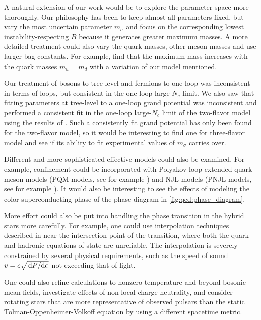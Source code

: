 A natural extension of our work would be to
explore the parameter space more thoroughly.
Our philosophy has been to keep almost all parameters fixed,
but vary the most uncertain parameter $m_\sigma$ and focus on the corresponding lowest instability-respecting $B$
because it generates greater maximum masses.
A more detailed treatment could also vary the quark masses,
other meson masses and use larger bag constants.
For example, \cite{ref:lsm3f_compact_stars}
find that the maximum mass increases with the quark masses $m_u=m_d$
with a variation of our model mentioned.

Our treatment of bosons to tree-level and fermions to one loop was inconsistent in terms of loops,
but consistent in the one-loop large-$N_c$ limit.
We also saw that fitting parameters at tree-level to a one-loop grand potential was inconsistent
and performed a consistent fit in the one-loop large-$N_c$ limit of the two-flavor model using the results of \cite{ref:jo_lsm_consistent_chiral,ref:jo_lsm_consistent_physical}.
Such a consistently fit grand potential has only been found for the two-flavor model,
so it would be interesting to find one for three-flavor model and see if its ability to fit experimental values of $m_\sigma$ carries over.

Different and more sophisticated effective models could also be examined.
For example, confinement could be incorporated with Polyakov-loop extended quark-meson models (PQM models, see for example \cite{ref:pqm_2f,ref:pqm_3f,ref:master_folkestad}) and NJL models (PNJL models, see for example \cite{ref:pnjl_2f,ref:pnjl_3f,ref:pnjl_3f_zeroT}).
It would also be interesting to see the effects of modeling the color-superconducting phase of the phase diagram in \cref{fig:qcd:phase_diagram}.

More effort could also be put into handling the phase transition in the hybrid stars more carefully.
For example, one could use interpolation techniques described in \cite{ref:quark_star_review}
near the intersection point of the transition,
where both the quark and hadronic equations of state are unreliable.
The interpolation is severely constrained by several physical requirements,
such as the speed of sound $v = c \sqrt{\odv{P}/{\epsilon}}$ not exceeding that of light.

One could also refine calculations to nonzero temperature and beyond bosonic mean fields,
investigate effects of non-local charge neutrality,
and consider rotating stars that are more representative of observed pulsars than the static Tolman-Oppenheimer-Volkoff equation by using a different spacetime metric.
